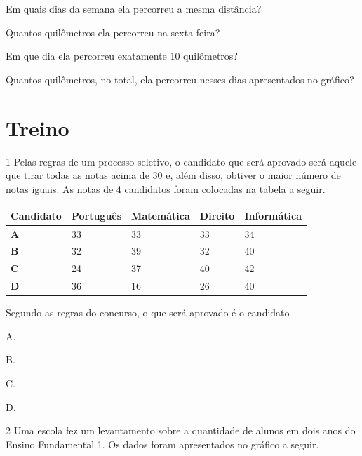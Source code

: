 \begin{escolha}
\item
  Em quais dias da semana ela percorreu a mesma distância?

\item
  Quantos quilômetros ela percorreu na sexta-feira?

\item
  Em que dia ela percorreu exatamente 10 quilômetros?

\item
  Quantos quilômetros, no total, ela percorreu nesses dias apresentados no gráfico?
\end{escolha}

\pagebreak
\section*{Treino}

\num{1} Pelas regras de um processo seletivo, o candidato que será aprovado será
aquele que tirar todas as notas acima de 30 e, além disso, obtiver o maior
número de notas iguais. As notas de 4 candidatos foram colocadas na
tabela a seguir.

\begin{longtable}[]{@{}lllll@{}}
\toprule
\textbf{Candidato} & \textbf{Português} & \textbf{Matemática} & \textbf{Direito} &
\textbf{Informática}\tabularnewline
\midrule
\endhead
\textbf{A} & 33 & 33 & 33 & 34\tabularnewline
\textbf{B} & 32 & 39 & 32 & 40\tabularnewline
\textbf{C} & 24 & 37 & 40 & 42\tabularnewline
\textbf{D} & 36 & 16 & 26 & 40\tabularnewline
\bottomrule
\end{longtable}

Segundo as regras do concurso, o que será aprovado é o candidato

\begin{multicols}{2}
\begin{escolha}
\item
  A.
\item
  B.
\item
  C.
\item
  D.
\end{escolha}
\end{multicols}


\num{2} Uma escola fez um levantamento sobre a quantidade de alunos em dois anos
do Ensino Fundamental 1. Os dados foram apresentados no gráfico a seguir.

